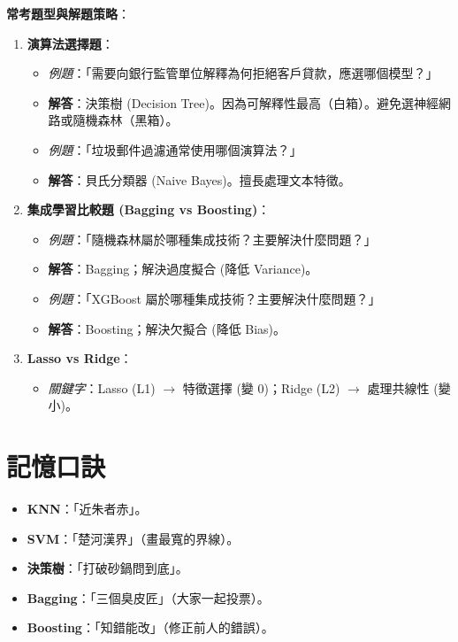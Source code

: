 \documentclass[
  letterpaper,
  DIV=11,
  numbers=noendperiod]{scrreprt}
\providecommand{\tightlist}{%
  \setlength{\itemsep}{0pt}\setlength{\parskip}{0pt}}
\begin{document}
\textbf{常考題型與解題策略}：

\begin{enumerate}
\def\labelenumi{\arabic{enumi}.}
\tightlist
\item
  \textbf{演算法選擇題}：

  \begin{itemize}
  \tightlist
  \item
    \emph{例題}：「需要向銀行監管單位解釋為何拒絕客戶貸款，應選哪個模型？」
  \item
    \textbf{解答}：決策樹 (Decision
    Tree)。因為可解釋性最高（白箱）。避免選神經網路或隨機森林（黑箱）。
  \item
    \emph{例題}：「垃圾郵件過濾通常使用哪個演算法？」
  \item
    \textbf{解答}：貝氏分類器 (Naive Bayes)。擅長處理文本特徵。
  \end{itemize}
\item
  \textbf{集成學習比較題 (Bagging vs Boosting)}：

  \begin{itemize}
  \tightlist
  \item
    \emph{例題}：「隨機森林屬於哪種集成技術？主要解決什麼問題？」
  \item
    \textbf{解答}：Bagging；解決過度擬合 (降低 Variance)。
  \item
    \emph{例題}：「XGBoost 屬於哪種集成技術？主要解決什麼問題？」
  \item
    \textbf{解答}：Boosting；解決欠擬合 (降低 Bias)。
  \end{itemize}
\item
  \textbf{Lasso vs Ridge}：

  \begin{itemize}
  \tightlist
  \item
    \emph{關鍵字}：Lasso (L1) \(\rightarrow\) 特徵選擇 (變 0)；Ridge
    (L2) \(\rightarrow\) 處理共線性 (變小)。
  \end{itemize}
\end{enumerate}

\section{記憶口訣}\label{ux8a18ux61b6ux53e3ux8a23-4}

\begin{itemize}
\tightlist
\item
  \textbf{KNN}：「近朱者赤」。
\item
  \textbf{SVM}：「楚河漢界」（畫最寬的界線）。
\item
  \textbf{決策樹}：「打破砂鍋問到底」。
\item
  \textbf{Bagging}：「三個臭皮匠」（大家一起投票）。
\item
  \textbf{Boosting}：「知錯能改」（修正前人的錯誤）。
\end{itemize}
\end{document}

